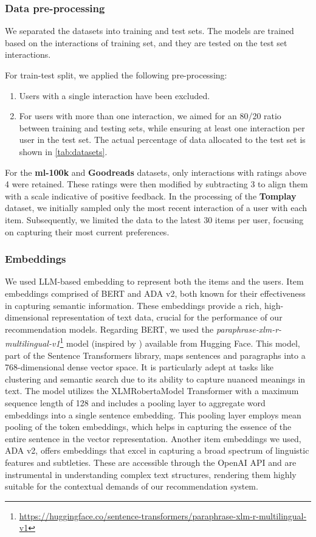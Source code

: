 \subsubsection{Data pre-processing}
\label{subsec:data_preprocessing}


 We separated the datasets into training and test sets. The models are trained based on the interactions of training set, and they are tested on the test set interactions.
 
 For train-test split, we applied the following pre-processing:
\begin{enumerate}
    \item Users with a single interaction have been excluded.
    \item For users with more than one interaction, we aimed for an 80/20 ratio between training and testing sets, while ensuring at least one interaction per user in the test set. The actual percentage of data allocated to the test set is shown in \autoref{tab:datasets}.
\end{enumerate}

For the \textbf{ml-100k} and \textbf{Goodreads} datasets, only interactions with ratings above 4 were retained. These ratings were then modified by subtracting 3 to align them with a scale indicative of positive feedback.
In the processing of the \textbf{Tomplay} dataset, we initially sampled only the most recent interaction of a user with each item. Subsequently, we limited the data to the latest 30 items per user, focusing on capturing their most current preferences.


\subsubsection{Embeddings}
\label{embeddings}

We used LLM-based embedding to represent both the items and the users. Item embeddings comprised of BERT and ADA v2, both known for their effectiveness in capturing semantic information. These embeddings provide a rich, high-dimensional representation of text data, crucial for the performance of our recommendation models. Regarding BERT, we used the \textit{paraphrase-xlm-r-multilingual-v1}\footnote{\url{https://huggingface.co/sentence-transformers/paraphrase-xlm-r-multilingual-v1}} model (inspired by \cite{tomplay}) available from Hugging Face. This model, part of the Sentence Transformers library, maps sentences and paragraphs into a 768-dimensional dense vector space. It is particularly adept at tasks like clustering and semantic search due to its ability to capture nuanced meanings in text. The model utilizes the XLMRobertaModel Transformer with a maximum sequence length of 128 and includes a pooling layer to aggregate word embeddings into a single sentence embedding. This pooling layer employs mean pooling of the token embeddings, which helps in capturing the essence of the entire sentence in the vector representation. Another item embeddings we used, ADA v2, offers embeddings that excel in capturing a broad spectrum of linguistic features and subtleties. These are accessible through the OpenAI API and are instrumental in understanding complex text structures, rendering them highly suitable for the contextual demands of our recommendation system.

